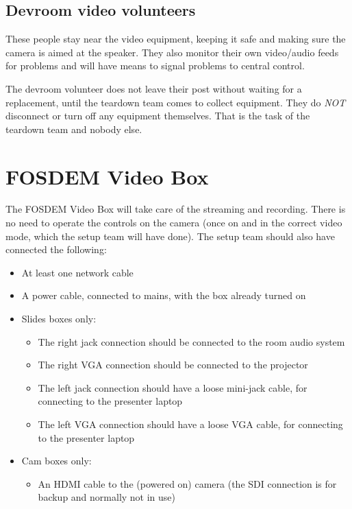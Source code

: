 \documentclass{article}
\begin{document}
\subsection{Devroom video volunteers}
These people stay near the video equipment, keeping it safe and making sure the camera is aimed at the speaker.
They also monitor their own video/audio feeds for problems and will have means to signal problems to central control.

The devroom volunteer does not leave their post without waiting for a replacement, until the teardown team comes to collect equipment. They do \emph{NOT} disconnect or turn off any equipment themselves. That is the task of the teardown team and nobody else.

\section{FOSDEM Video Box}
The FOSDEM Video Box will take care of the streaming and recording.
There is no need to operate the controls on the camera (once on and in the correct video mode, which the setup team will have done). The setup team should also have connected the following:
\begin{itemize}
  \item At least one network cable
  \item A power cable, connected to mains, with the box already turned on
  \item Slides boxes only:
    \begin{itemize}
      \item The right jack connection should be connected to the room audio system
      \item The right VGA connection should be connected to the projector
      \item The left jack connection should have a loose mini-jack cable, for connecting to the presenter laptop
      \item The left VGA connection should have a loose VGA cable, for connecting to the presenter laptop
    \end{itemize}
  \item Cam boxes only:
    \begin{itemize}
      \item An HDMI cable to the (powered on) camera (the SDI connection is for backup and normally not in use)
    \end{itemize}
\end{itemize}
\end{document}
